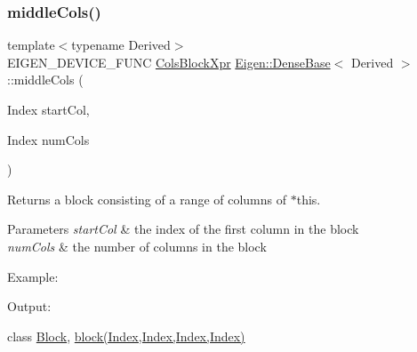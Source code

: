 \subsubsection{\texorpdfstring{middleCols()}{middleCols()}\hspace{0.1cm}{\footnotesize\ttfamily [1/2]}}
{\footnotesize\ttfamily template$<$typename Derived$>$ \\
E\+I\+G\+E\+N\+\_\+\+D\+E\+V\+I\+C\+E\+\_\+\+F\+U\+NC \mbox{\hyperlink{class_eigen_1_1_block}{Cols\+Block\+Xpr}} \mbox{\hyperlink{class_eigen_1_1_dense_base}{Eigen\+::\+Dense\+Base}}$<$ Derived $>$\+::middle\+Cols (\begin{DoxyParamCaption}\item[{Index}]{start\+Col,  }\item[{Index}]{num\+Cols }\end{DoxyParamCaption})\hspace{0.3cm}{\ttfamily [inline]}}

\begin{DoxyReturn}{Returns}
a block consisting of a range of columns of $\ast$this.
\end{DoxyReturn}

\begin{DoxyParams}{Parameters}
{\em start\+Col} & the index of the first column in the block \\
\hline
{\em num\+Cols} & the number of columns in the block\\
\hline
\end{DoxyParams}
Example\+: 
\begin{DoxyCodeInclude}{0}
\end{DoxyCodeInclude}
 Output\+: 
\begin{DoxyVerbInclude}
\end{DoxyVerbInclude}
 class \mbox{\hyperlink{class_eigen_1_1_block}{Block}}, \mbox{\hyperlink{class_eigen_1_1_dense_base_ab8e42e67c5cfd5fa13e684642f0f65bf}{block(\+Index,\+Index,\+Index,\+Index)}} \mbox{\label{class_eigen_1_1_dense_base_a1c1a900f7a0e5b885f7af331b6678f70}} 
